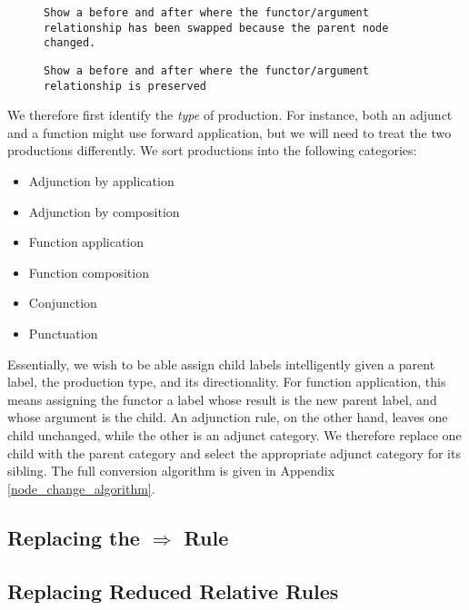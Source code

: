 \begin{figure}
 \begin{verbatim}
Show a before and after where the functor/argument relationship has been swapped because the parent node changed.
 \end{verbatim}
\label{faulty_transform}
\end{figure}

\begin{figure}
 \begin{verbatim}
Show a before and after where the functor/argument relationship is preserved
 \end{verbatim}
\label{correct_transform}
\end{figure}

We therefore first identify the \emph{type} of production. For instance, both an adjunct and a function might use forward application, but we will need to treat the two productions differently. We sort productions into the following categories:
\begin{itemize}
\item Adjunction by application
\item Adjunction by composition
\item Function application
\item Function composition
\item Conjunction
\item Punctuation
\end{itemize}

Essentially, we wish to be able assign child labels intelligently given a parent label, the production type, and its directionality. For function application, this means assigning the functor a label whose result is the new parent label, and whose argument is the child. An adjunction rule, on the other hand, leaves one child unchanged, while the other is an adjunct category. We therefore replace one child with the parent category and select the appropriate adjunct category for its sibling. The full conversion algorithm is given in Appendix \ref{node_change_algorithm}.

\subsection{Replacing the $\Rightarrow$ Rule}

\subsection{Replacing Reduced Relative Rules}


